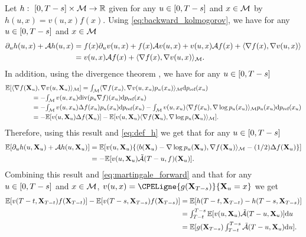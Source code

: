   Let $h: \ \left[0,T-s\right] \times \mathcal M \to \mathbb{R}$ given for any
  $u \in \left[0,T-s\right]$ and $x \in \mathcal M$ by $h(u,x) = v(u,x) f(x)$. Using
  \eqref{eq:backward_kolmogorov}, we have for any $u \in \left[0,T-s\right]$ and
  $x \in \mathcal M$
  \begin{align}
    \label{eq:def_h}
    \partial_u h(u,x) + \mathcal{A} h(u, x) &= f(x) \partial_u v(u,x)  + f(x) \mathcal{A} v(u,x) + v(u,x) \mathcal{A} f(x) +  \langle \nabla f(x), \nabla v(u,x)\rangle \\
    &=  v(u,x) \mathcal{A} f(x) + \langle \nabla f(x), \nabla v(u,x)\rangle_\mathcal M  . 
  \end{align}
  In addition, using the
      divergence theorem \citep[see][p.51]{lee2018introduction}, we have for any $u \in \left[0,T-s\right]$
  \begin{align}
    &\mathbb{E} [ \langle \nabla f(\mathbf{X}_u), \nabla v(u,\mathbf{X}_u)\rangle_\mathcal M ] = \textstyle{\int_{\mathcal M} \langle \nabla f(x_u), \nabla v(u,x_u) p_u(x_u) \rangle_\mathcal M\mathrm{d}p_{\textup{ref}}(x_u) } \\
                                                                    & \qquad \qquad = - \textstyle{\int_{\mathcal M} v(u,x_u) \mathrm{div}(p_u \nabla f) (x_u) \mathrm{d}p_{\textup{ref}}(x_u) } \\
                                                                    & \qquad \qquad = - \textstyle{\int_{\mathcal M} v(u,x_u) \Delta f(x_u) p_u(x_u) \mathrm{d}p_{\textup{ref}}(x_u) - \int_{\mathcal M} v(u,x_u) \langle \nabla f(x_u), \nabla \log p_u(x_u) \rangle_\mathcal Mp_u(x_u) \mathrm{d}p_{\textup{ref}}(x_u) } \\
                                                                    & \qquad \qquad = - \textstyle{\mathbb{E}[  v(u,\mathbf{X}_u) \Delta f(\mathbf{X}_u) ]  - \mathbb{E}[  v(u,\mathbf{X}_u) \langle \nabla f(\mathbf{X}_u), \nabla \log p_u(\mathbf{X}_u) \rangle_\mathcal M] }  .
  \end{align}
  Therefore, using this result and \eqref{eq:def_h} we get that for any
  $u \in \left[0,T-s\right]$
  \begin{align}
    \mathbb{E} [ \partial_u h(u,\mathbf{X}_u) + \mathcal{A} h(u, \mathbf{X}_u) ] &= \mathbb{E} [ v(u,\mathbf{X}_u)\{ \langle b(\mathbf{X}_u) - \nabla \log p_u(\mathbf{X}_u), \nabla f(\mathbf{X}_u) \rangle_\mathcal M -(1/2) \Delta f(\mathbf{X}_u)\} ] \\
    &= -\mathbb{E} [ v(u,\mathbf{X}_u)\tilde{\mathcal{A}}(T-u,f)(\mathbf{X}_u) ]  . 
  \end{align}
  Combining this result and \eqref{eq:martingale_forward} and that for any
  $u \in \left[0,T-s\right]$ and $x \in \mathcal M$,
  $v(u,x) = \CPELigne{g(\bfX_{T-s})}{\bfX_u=x}$ we get
  \begin{align}
    \mathbb{E} [ v(T-t,\mathbf{X}_{T-t})f(\mathbf{X}_{T-t}) ] - \mathbb{E} [ v(T-s,\mathbf{X}_{T-s})f(\mathbf{X}_{T-s}) ] &= \mathbb{E} [ h(T-t, \mathbf{X}_{T-t}) - h(T-s, \mathbf{X}_{T-s}) ] \\
                                                                                            &= \textstyle{\int_{T-t}^{T-s} \mathbb{E}[ v(u,\mathbf{X}_u)\tilde{\mathcal{A}}(T-u, \mathbf{X}_u) ] \mathrm{d}u } \\
    &= \textstyle{\mathbb{E}[ g(\mathbf{X}_{T-s})\int_{T-t}^{T-s} \tilde{\mathcal{A}}(T-u, \mathbf{X}_u) \mathrm{d}u  ] .}\\
  \end{align}

